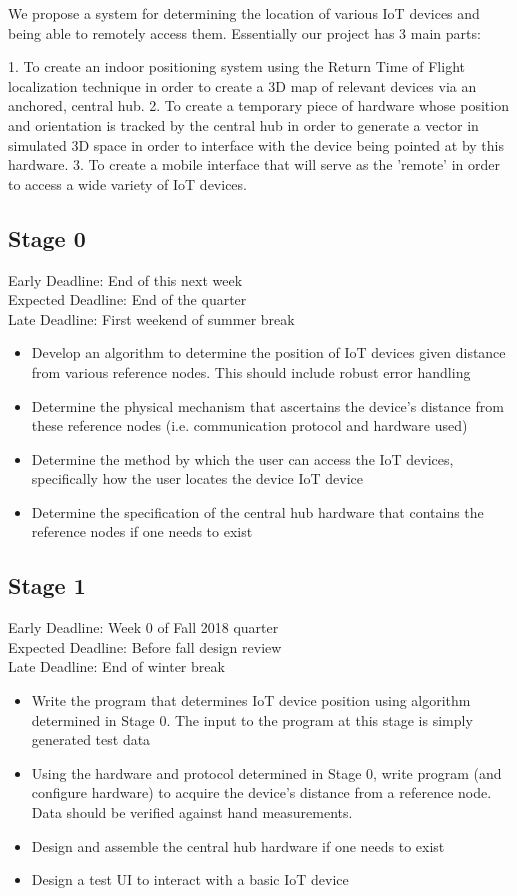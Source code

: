 \documentclass{article}
\begin{document}
We propose a system for determining the location of various IoT devices and being able to remotely access them.
Essentially our project has 3 main parts:

1. To create an indoor positioning system using the Return Time of Flight localization technique in order to create a 3D map of relevant devices via an anchored, central hub.
2. To create a temporary piece of hardware whose position and orientation is tracked by the central hub in order to generate a vector in simulated 3D space in order to interface with the device being pointed at by this hardware.
3. To create a mobile interface that will serve as the 'remote' in order to access a wide variety of IoT devices.

\subsection{Stage 0}
Early Deadline: End of this next week \\
Expected Deadline: End of the quarter \\
Late Deadline: First weekend of summer break \\
\begin{itemize}
\item Develop an algorithm to determine the position of IoT devices given distance from various reference nodes. This should include robust error handling
\item Determine the physical mechanism that ascertains the device's distance from these reference nodes (i.e. communication protocol and hardware used)
\item Determine the method by which the user can access the IoT devices, specifically how the user locates the device IoT device
\item Determine the specification of the central hub hardware that contains the reference nodes if one needs to exist
\end{itemize}

\subsection{Stage 1}
Early Deadline: Week 0 of Fall 2018 quarter \\
Expected Deadline: Before fall design review \\
Late Deadline: End of winter break \\
\begin{itemize}
\item Write the program that determines IoT device position using algorithm determined in Stage 0. The input to the program at this stage is simply generated test data
\item Using the hardware and protocol determined in Stage 0, write program (and configure hardware) to acquire the device's distance from a reference node. Data should be verified against hand measurements.
\item Design and assemble the central hub hardware if one needs to exist
\item Design a test UI to interact with a basic IoT device
\end{itemize}
\end{document}
